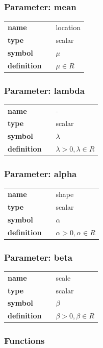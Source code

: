 \subsubsection*{Parameter: mean}

\noindent\begin{tabular}{p{2cm}cl}
\textbf{name} & & location \\
\textbf{type} & & scalar \\
\textbf{symbol} & & $\mu$  \\
\textbf{definition} & & $\mu \in  R$
\end{tabular}
\subsubsection*{Parameter: lambda}

\noindent\begin{tabular}{p{2cm}cl}
\textbf{name} & & - \\
\textbf{type} & & scalar \\
\textbf{symbol} & & $\lambda$  \\
\textbf{definition} & & $\lambda > 0, \lambda \in  R$
\end{tabular}
\subsubsection*{Parameter: alpha}

\noindent\begin{tabular}{p{2cm}cl}
\textbf{name} & & shape \\
\textbf{type} & & scalar \\
\textbf{symbol} & & $\alpha$  \\
\textbf{definition} & & $\alpha > 0, \alpha \in  R$
\end{tabular}
\subsubsection*{Parameter: beta}

\noindent\begin{tabular}{p{2cm}cl}
\textbf{name} & & scale \\
\textbf{type} & & scalar \\
\textbf{symbol} & & $\beta$  \\
\textbf{definition} & & $\beta > 0, \beta \in  R$
\end{tabular}
\subsubsection*{Functions}

